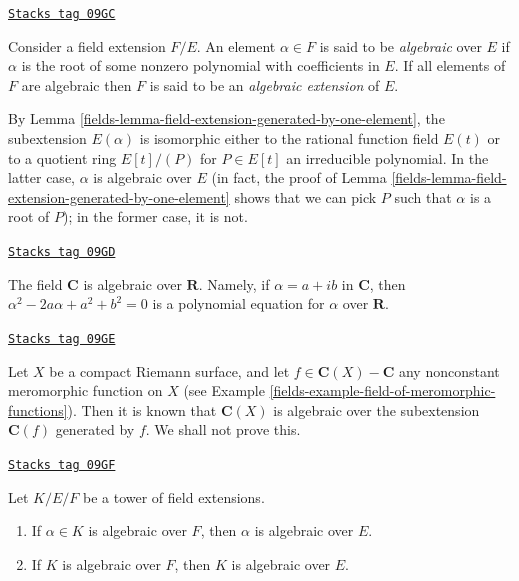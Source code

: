 \begin{definition}[Algebraic]
\label{fields-definition-algebraic}
\href{https://stacks.math.columbia.edu/tag/09GC}{\texttt{Stacks tag 09GC}}

Consider a field extension $F/E$. An element $\alpha \in F$ is said to be
{\it algebraic} over $E$ if $\alpha$ is the root of some nonzero polynomial
with coefficients in $E$. If all elements of $F$ are algebraic then $F$ is
said to be an {\it algebraic extension} of $E$.
\end{definition}

By Lemma \ref{fields-lemma-field-extension-generated-by-one-element}, the
subextension $E(\alpha)$ is isomorphic either to the rational function
field $E(t)$ or to a quotient ring $E[t]/(P)$ for $P \in E[t]$ an
irreducible polynomial. In the latter case, $\alpha$ is algebraic over
$E$ (in fact, the proof of
Lemma \ref{fields-lemma-field-extension-generated-by-one-element}
shows that we can pick $P$ such that $\alpha$ is a root of $P$);
in the former case, it is not.

\begin{example}
\label{fields-example-C-algebraic-over-R}
\href{https://stacks.math.columbia.edu/tag/09GD}{\texttt{Stacks tag 09GD}}

The field $\mathbf{C}$ is algebraic over $\mathbf{R}$. Namely, if
$\alpha = a + ib$ in $\mathbf{C}$, then $\alpha^2 - 2a\alpha + a^2 + b^2 = 0$
is a polynomial equation for $\alpha$ over $\mathbf{R}$.
\end{example}

\begin{example}
\label{fields-example-compact-riemann-surface-is-finite-over-P1}
\href{https://stacks.math.columbia.edu/tag/09GE}{\texttt{Stacks tag 09GE}}

Let $X$ be a compact Riemann surface, and let
$f \in \mathbf{C}(X) - \mathbf{C}$ any nonconstant meromorphic function
on $X$ (see Example \ref{fields-example-field-of-meromorphic-functions}). Then it is
known that $\mathbf{C}(X)$ is algebraic over the subextension
$\mathbf{C}(f)$ generated by $f$. We shall not prove this.
\end{example}

\begin{lemma}
\label{fields-lemma-algebraic-goes-up}
\href{https://stacks.math.columbia.edu/tag/09GF}{\texttt{Stacks tag 09GF}}

Let $K/E/F$ be a tower of field extensions.
\begin{enumerate}
\item If $\alpha \in K$ is algebraic over $F$, then $\alpha$ is algebraic
over $E$.
\item If $K$ is algebraic over $F$, then $K$ is algebraic over $E$.
\end{enumerate}
\end{lemma}

